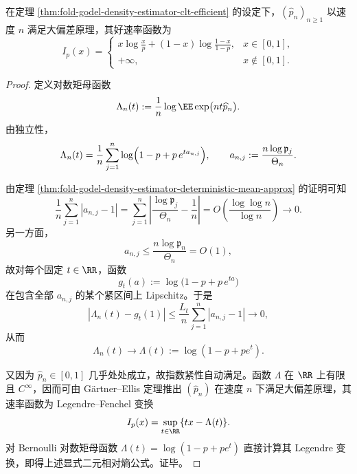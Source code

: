 \begin{theorem}\label{thm:fold-godel-density-estimator-cramer-ldp}
在定理 \ref{thm:fold-godel-density-estimator-clt-efficient} 的设定下，\((\widehat p_n)_{n\ge 1}\) 以速度 \(n\) 满足大偏差原理，其好速率函数为
\[
I_p(x)=
\begin{cases}
x\log\frac{x}{p}+(1-x)\log\frac{1-x}{1-p},& x\in[0,1],\\[2mm]
+\infty,& x\notin[0,1].
\end{cases}
\]
\end{theorem}
\begin{proof}
定义对数矩母函数
\[
\Lambda_n(t):=\frac1n\log \EE\exp\bigl(nt\widehat p_n\bigr).
\]
由独立性，
\[
\Lambda_n(t)
=
\frac1n\sum_{j=1}^{n}
\log\Bigl(1-p+p\,e^{t a_{n,j}}\Bigr),
\qquad
a_{n,j}:=\frac{n\log \mathfrak p_j}{\Theta_n}.
\]

由定理 \ref{thm:fold-godel-density-estimator-deterministic-mean-approx} 的证明可知
\[
\frac1n\sum_{j=1}^{n}|a_{n,j}-1|
=
\sum_{j=1}^{n}\left|\frac{\log \mathfrak p_j}{\Theta_n}-\frac1n\right|
=
O\!\left(\frac{\log\log n}{\log n}\right)\to 0.
\]
另一方面，
\[
a_{n,j}\le \frac{n\log \mathfrak p_n}{\Theta_n}=O(1),
\]
故对每个固定 \(t\in\RR\)，函数
\[
g_t(a):=\log\bigl(1-p+p\,e^{ta}\bigr)
\]
在包含全部 \(a_{n,j}\) 的某个紧区间上 Lipschitz。于是
\[
\left|\Lambda_n(t)-g_t(1)\right|
\le
\frac{L_t}{n}\sum_{j=1}^{n}|a_{n,j}-1|
\to 0,
\]
从而
\[
\Lambda_n(t)\to \Lambda(t):=\log(1-p+pe^t).
\]

又因为 \(\widehat p_n\in[0,1]\) 几乎处处成立，故指数紧性自动满足。函数 \(\Lambda\) 在 \(\RR\) 上有限且 \(C^\infty\)，因而可由 Gärtner--Ellis 定理推出 \((\widehat p_n)\) 在速度 \(n\) 下满足大偏差原理，其速率函数为 Legendre--Fenchel 变换
\[
I_p(x)=\sup_{t\in\RR}\{tx-\Lambda(t)\}.
\]
对 Bernoulli 对数矩母函数 \(\Lambda(t)=\log(1-p+pe^t)\) 直接计算其 Legendre 变换，即得上述显式二元相对熵公式。证毕。
\end{proof}

